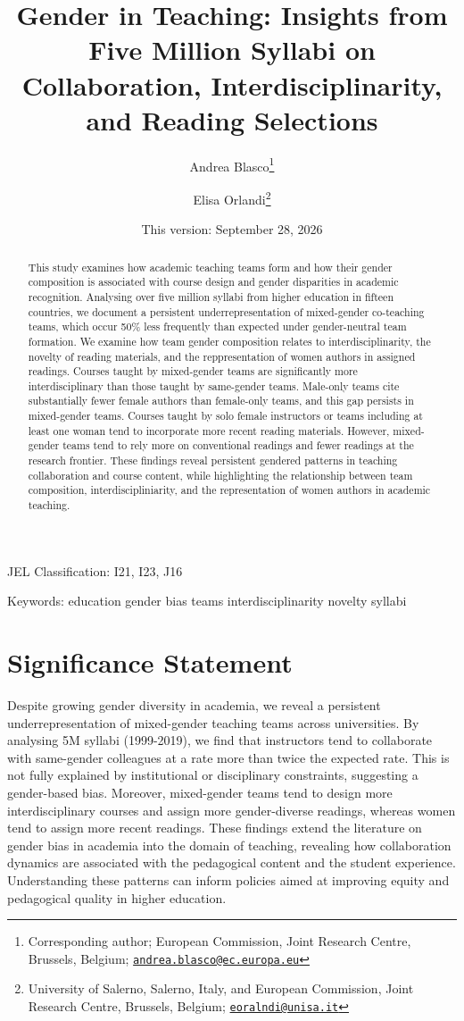 \documentclass[
  british,
  12pt,
]{article}
\title{Gender in Teaching:
Insights from Five Million Syllabi on Collaboration, Interdisciplinarity, and Reading Selections}
\author{Andrea Blasco\footnote{Corresponding author; European Commission, Joint Research Centre, Brussels, Belgium; \href{mailto:andrea.blasco@ec.europa.eu}{\nolinkurl{andrea.blasco@ec.europa.eu}}} \and Elisa Orlandi\footnote{University of Salerno, Salerno, Italy, and European Commission, Joint Research Centre, Brussels, Belgium; \href{mailto:eoralndi@unisa.it}{\nolinkurl{eoralndi@unisa.it}}}}
\date{This version: September 28, 2026}
\begin{document}
\maketitle
\begin{abstract}
This study examines how academic teaching teams form and how their gender composition is associated with course design and gender disparities in academic recognition. Analysing over five million syllabi from higher education in fifteen countries, we document a persistent underrepresentation of mixed-gender co-teaching teams, which occur 50\% less frequently than expected under gender-neutral team formation. We examine how team gender composition relates to interdisciplinarity, the novelty of reading materials, and the reppresentation of women authors in assigned readings. Courses taught by mixed-gender teams are significantly more interdisciplinary than those taught by same-gender teams. Male-only teams cite substantially fewer female authors than female-only teams, and this gap persists in mixed-gender teams. Courses taught by solo female instructors or teams including at least one woman tend to incorporate more recent reading materials. However, mixed-gender teams tend to rely more on conventional readings and fewer readings at the research frontier. These findings reveal persistent gendered patterns in teaching collaboration and course content, while highlighting the relationship between team composition, interdiscipliniarity, and the representation of women authors in academic teaching.
\end{abstract}

JEL Classification: I21, I23, J16

Keywords: education \textbar{} gender bias \textbar{} teams \textbar{} interdisciplinarity \textbar{} novelty \textbar{} syllabi

\newpage

\section*{Significance Statement}\label{significance-statement}

Despite growing gender diversity in academia, we reveal a persistent underrepresentation of mixed-gender teaching teams across universities. By analysing 5M syllabi (1999-2019), we find that instructors tend to collaborate with same-gender colleagues at a rate more than twice the expected rate. This is not fully explained by institutional or disciplinary constraints, suggesting a gender-based bias. Moreover, mixed-gender teams tend to design more interdisciplinary courses and assign more gender-diverse readings, whereas women tend to assign more recent readings. These findings extend the literature on gender bias in academia into the domain of teaching, revealing how collaboration dynamics are associated with the pedagogical content and the student experience. Understanding these patterns can inform policies aimed at improving equity and pedagogical quality in higher education.
\end{document}
